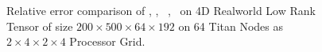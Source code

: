 
\begin{figure}
	\caption{Relative error comparison of \MU, \HALS, \BPP\, \ADMM, \Nestrov\ on 4D Realworld Low Rank Tensor of size $200 \times 500 \times 64 \times 192$ on 64 Titan Nodes as $2\times4\times2\times4$ Processor Grid.}
	\label{fig:convergencerealworld}
\end{figure}



